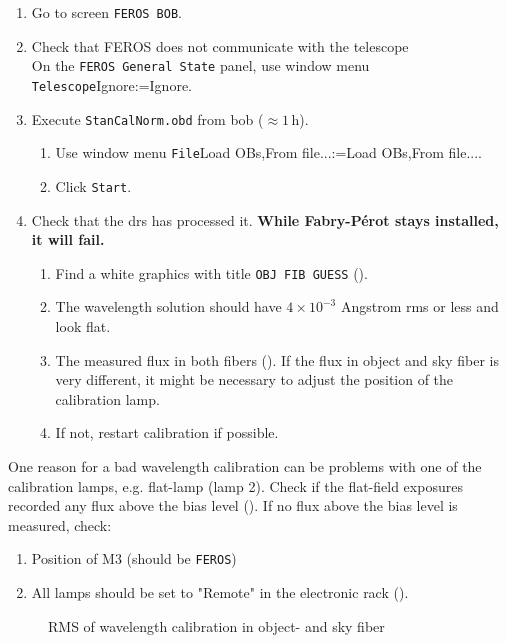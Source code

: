\documentclass[11pt,fleqn,a4paper]{book}
\makeatletter
\def\menu#1#2{\texttt{#1}\ifx{}#2\else\@for\@x:=#2\do{$\rightarrow$\texttt{\@x}}\fi}
\def\wmenu#1#2{window menu \menu{#1}{#2}}
\def\fetchob{\wmenu{File}{Load OBs,From file...}}
\makeatother
\begin{document}
\begin{enumerate}
  \item Go to screen \texttt{FEROS BOB}.
  \item Check that FEROS does not communicate with the telescope\\
        On the \texttt{FEROS \gls{General State}} panel, use \wmenu{Telescope}{Ignore}.
  \item Execute \texttt{StanCalNorm.obd} from \gls{bob} ($\approx 1$\,h).
    \begin{enumerate}
       \item Use \fetchob.
       \item Click \texttt{Start}.
    \end{enumerate}
  \item Check that the \gls{drs} has processed it.  \textbf{While Fabry-Pérot stays installed, it will fail.}
    \begin{enumerate}
      \item Find a white graphics with title \texttt{OBJ FIB GUESS} ().
      \item The wavelength solution should have $4 \times 10^{-3}$ Angstrom
         rms or less and look flat.
      \item The measured flux in both fibers (). If the flux in object and sky fiber is very different, it might be necessary to adjust the position of the calibration lamp.
      \item If not, restart calibration if possible.
    \end{enumerate}
\end{enumerate}


One reason for a bad wavelength calibration can be problems with one of the calibration lamps, e.g. flat-lamp (lamp 2). Check if the flat-field exposures recorded any flux above the bias level (). If no flux above the bias level is measured, check:

\begin{enumerate}
\item Position of M3 (should be \texttt{FEROS})
\item All lamps should be set to "Remote" in the electronic rack (). 
\end{enumerate}

\begin{figure*}
\hfill
{}
\caption{RMS of wavelength calibration in object- and sky fiber}
\label{fig:feros-rms}
\end{figure*}
\end{document}
